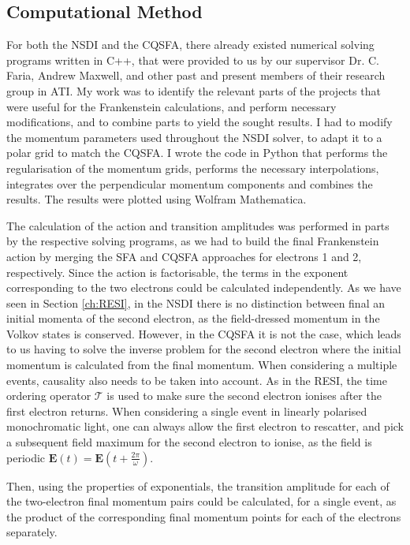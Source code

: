 \documentclass[11pt]{article}
\numberwithin{equation}{section}
\begin{document}
\subsection{Computational Method} \label{ch:comp_method}
For both the NSDI and the CQSFA, there already existed numerical solving programs written in C++, that were provided to us by our supervisor Dr. C. Faria, Andrew Maxwell, and other past and present members of their research group in ATI. My work was to identify the relevant parts of the projects that were useful for the Frankenstein calculations, and perform necessary modifications, and to combine parts to yield the sought results. I had to modify the momentum parameters used throughout the NSDI solver, to adapt it to a polar grid to match the CQSFA. I wrote the code in Python that performs the regularisation of the momentum grids, performs the necessary interpolations, integrates over the perpendicular momentum components and combines the results. The results were plotted using Wolfram Mathematica.
\par
The calculation of the action and transition amplitudes was performed in parts by the respective solving programs, as we had to build the final Frankenstein action by merging the SFA and CQSFA approaches for electrons 1 and 2, respectively. Since the action is factorisable, the terms in the exponent corresponding to the two electrons could be calculated independently. As we have seen in Section \ref{ch:RESI}, in the NSDI there is no distinction between final an initial momenta of the second electron, as the field-dressed momentum in the Volkov states is conserved. However, in the CQSFA it is not the case, which leads to us having to solve the inverse problem for the second electron where the initial momentum is calculated from the final momentum. When considering a multiple events, causality also needs to be taken into account. As in the RESI, the time ordering operator $\mathcal{T}$ is used to make sure the second electron ionises after the first electron returns. When considering a single event in linearly polarised monochromatic light, one can always allow the first electron to rescatter, and pick a subsequent field maximum for the second electron to ionise, as the field is periodic $\mathbf{E}(t) = \mathbf{E}(t+\frac{2\pi}{\omega})$.
\par
Then, using the properties of exponentials, the transition amplitude for each of the two-electron final momentum pairs could be calculated, for a single event, as the product of the corresponding final momentum points for each of the electrons separately.
\end{document}
